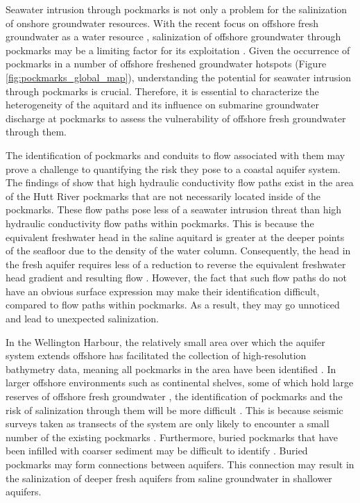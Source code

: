 \documentclass[pdflatex,sn-apa]{sn-jnl}%
\begin{document}
Seawater intrusion through pockmarks is not only a problem for the salinization of onshore groundwater resources.
With the recent focus on offshore fresh groundwater as a water resource \citep{bakken_submarine_2012, zamrsky_offshore_2022},
salinization of offshore groundwater through pockmarks may be a limiting factor for its exploitation \citep{gyopari_wellington_2018}.
Given the occurrence of pockmarks in a number of offshore freshened groundwater hotspots (Figure \ref{fig:pockmarks_global_map}),
understanding the potential for seawater intrusion through pockmarks is crucial.
Therefore, it is essential to characterize the heterogeneity of the aquitard and its influence on submarine groundwater discharge at pockmarks to assess the vulnerability of offshore fresh groundwater through them.

The identification of pockmarks and conduits to flow associated with them may prove a challenge to quantifying the risk they pose to a coastal aquifer system.
The findings of \cite{hoffmann_fresh_2023} show that high hydraulic conductivity flow paths exist in the area of the Hutt River pockmarks that are not necessarily located inside of the pockmarks.
These flow paths pose less of a seawater intrusion threat than high hydraulic conductivity flow paths within pockmarks. This is because the
equivalent freshwater head in the saline aquitard is greater at the deeper points of the seafloor due to the density of the water column.
Consequently, the head in the fresh aquifer requires less of a reduction to reverse the equivalent freshwater head gradient and resulting flow \citep{post_variable_2022}.
However, the fact that such flow paths do not have an obvious surface expression may make their identification difficult, compared to flow paths within pockmarks. As a result,
they may go unnoticed and lead to unexpected salinization.

In the Wellington Harbour, the relatively small area over which the aquifer system extends offshore has facilitated the collection of high-resolution bathymetry data,
meaning all pockmarks in the area have been identified \citep{hoffmann_fresh_2023}. In larger offshore environments such as continental shelves,
some of which hold large reserves of offshore fresh groundwater \citep{zamrsky_offshore_2022}, the identification of pockmarks and the risk of salinization through them will be more difficult \citep{goff_modern_2019, gustafson_aquifer_2019}.
This is because seismic surveys taken as transects of the system are only likely to encounter a small number of the existing pockmarks \citep{bertoni_seismic_2020}.
Furthermore, buried pockmarks that have been infilled with coarser sediment may be difficult to identify  \citep{goff_modern_2019}.
Buried pockmarks may form connections between aquifers. This connection may result in the salinization of deeper fresh aquifers from saline groundwater in shallower aquifers.
\end{document}
